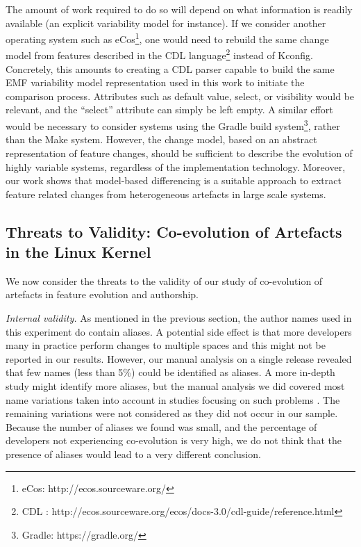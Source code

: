 The amount of work required to do so will depend on what information is readily available (an explicit variability model for instance).
If we consider another operating system such as eCos\footnote{eCos: http://ecos.sourceware.org/}, one would need to rebuild the same change model from features
described in the CDL language\footnote{CDL : http://ecos.sourceware.org/ecos/docs-3.0/cdl-guide/reference.html} instead of Kconfig.
Concretely, this amounts to creating a CDL parser capable to build the same EMF variability model representation used in this work to initiate the comparison process.
Attributes such as default value, select, or visibility would be relevant, and the ``select'' attribute can simply be left empty.
A similar effort would be necessary to consider systems using the Gradle build system\footnote{Gradle: https://gradle.org/}, rather than the Make system.
However, the change model, based on an abstract representation of feature changes,
should be sufficient to describe the evolution of highly variable systems, regardless of the implementation technology.
Moreover, our work shows that model-based differencing is a suitable approach to extract feature related changes
from heterogeneous artefacts in large scale systems.


\subsection{Threats to Validity: Co-evolution of Artefacts in the Linux Kernel}
We now consider the threats to the validity of our study of co-evolution
of artefacts in feature evolution and authorship.

\textit{Internal validity.}
As mentioned in the previous section, the author names used in this experiment do contain aliases.
A potential side effect is that more developers many in practice perform changes to multiple spaces 
and this might not be reported in our results.
However, our manual analysis on a single release revealed that few names (less than 5\%) could be identified as 
aliases.
A more in-depth study might identify more aliases, but the manual analysis we did covered most name variations
taken into account in studies focusing on such problems \citep{kouters_whos_2012}. 
The remaining variations were not considered as they did not occur in our sample.
Because the number of aliases we found was small, and the percentage of developers not experiencing co-evolution is very
high, we do not think that the presence of aliases would lead to a very different conclusion.

